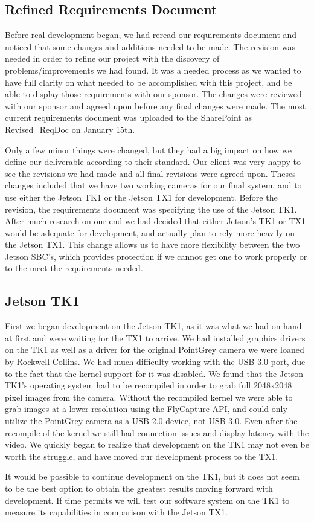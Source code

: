 \documentclass[letterpaper,10pt,titlepage]{IEEEtran}
\begin{document}
   \subsection{Refined Requirements Document}
   Before real development began, we had reread our requirements document and noticed that some changes and additions needed to be made. The revision was needed in order to refine our project with the discovery of problems/improvements we had found. It was a needed process as we wanted to have full clarity on what needed to be accomplished with this project, and be able to display those requirements with our sponsor. The changes were reviewed with our sponsor and agreed upon before any final changes were made. The most current requirements document was uploaded to the SharePoint as Revised\_ReqDoc on January 15th.\\ 
\par
Only a few minor things were changed, but they had a big impact on how we define our deliverable according to their standard. Our client was very happy to see the revisions we had made and all final revisions were agreed upon. Theses changes included that we have two working cameras for our final system, and to use either the Jetson TK1 or the Jetson TX1 for development. Before the revision, the requirements document was specifying the use of the Jetson TK1. After much research on our end we had decided that either Jetson's TK1 or TX1 would be adequate for development, and actually plan to rely more heavily on the Jetson TX1. This change allows us to have more flexibility between the two Jetson SBC's, which provides protection if we cannot get one to work properly or to the meet the requirements needed. 
   
   \subsection{Jetson TK1}
   First we began development on the Jetson TK1, as it was what we had on hand at first and were waiting for the TX1 to arrive. We had installed graphics drivers on the TK1 as well as a driver for the original PointGrey camera we were loaned by Rockwell Collins. We had much difficulty working with the USB 3.0 port, due to the fact that the kernel support for it was disabled. We found that the Jetson TK1's operating system had to be recompiled in order to grab full 2048x2048 pixel images from the camera. Without the recompiled kernel we were able to grab images at a lower resolution using the FlyCapture API, and could only utilize the PointGrey camera as a USB 2.0 device, not USB 3.0. Even after the recompile of the kernel we still had connection issues and display latency with the video. We quickly began to realize that development on the TK1 may not even be worth the struggle, and have moved our development process to the TX1.\\ 
\par
It would be possible to continue development on the TK1, but it does not seem to be the best option to obtain the greatest results moving forward with development. If time permits we will test our software system on the TK1 to measure its capabilities in comparison with the Jetson TX1.
   
\end{document}
